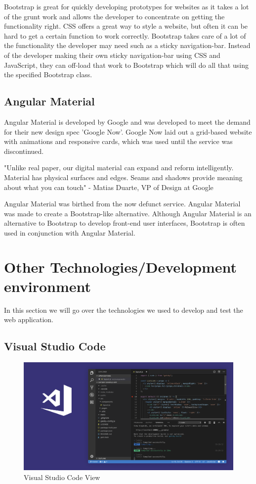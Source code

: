 Bootstrap is great for quickly developing prototypes for websites as it takes a lot of the grunt work and allows the developer to concentrate on getting the functionality right. CSS offers a great way to style a website, but often it can be hard to get a certain function to work correctly. Bootstrap takes care of a lot of the functionality the developer may need such as a sticky navigation-bar. Instead of the developer making their own sticky navigation-bar using CSS and JavaScript, they can off-load that work to Bootstrap which will do all that using the specified Bootstrap class.

\subsection{Angular Material}
Angular Material is developed by Google and was developed to meet the demand for their new design spec 'Google Now'. Google Now laid out a grid-based website with animations and responsive cards, which was used until the service was discontinued.

\begin{displayquote}
"Unlike real paper, our digital material can expand and reform intelligently. Material has physical surfaces and edges. Seams and shadows provide meaning about what you can touch" - Matias Duarte, VP of Design at Google
\end{displayquote}

Angular Material was birthed from the now defunct service. Angular Material was made to create a Bootstrap-like alternative. Although Angular Material is an alternative to Bootstrap to develop front-end user interfaces, Bootstrap is often used in conjunction with Angular Material.

\section{Other Technologies/Development environment}
In this section we will go over the technologies we used to develop and test the web application.

\subsection{Visual Studio Code}
\begin{figure}[H]
  \includegraphics[width=\linewidth]{img/opengraph-home.png}
  \caption{Visual Studio Code View}
  \label{fig:VSC}
\end{figure}

